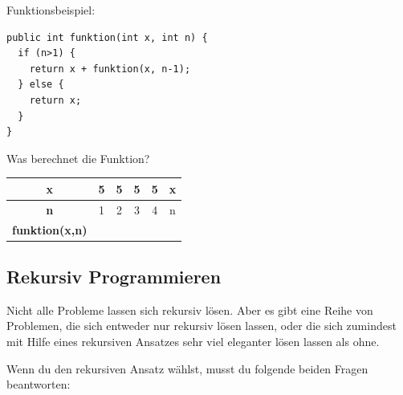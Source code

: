 

Funktionsbeispiel:

\begin{lstlisting}
public int funktion(int x, int n) {
  if (n>1) {
    return x + funktion(x, n-1);
  } else {
    return x;
  }
}
\end{lstlisting}

Was berechnet die Funktion?

\begin{tabular}{|c|c|c|c|c|c|}\hline
\textbf{x}             & 5 & 5 & 5 & 5 & x \\ \hline
\textbf{n}             & 1 & 2 & 3 & 4 & n \\ \hline
\textbf{funktion(x,n)} &  \hspace{1cm} & \hspace{1cm} & \hspace{1cm} &
\hspace{1cm} & \hspace{1cm} \\
\hline
\end{tabular}


\subsection{Rekursiv Programmieren}

Nicht alle Probleme lassen sich rekursiv lösen. Aber es gibt eine Reihe von
Problemen, die sich entweder nur rekursiv lösen lassen, oder die sich zumindest
mit Hilfe eines rekursiven Ansatzes sehr viel eleganter lösen lassen als ohne.

Wenn du den rekursiven Ansatz wählst, musst du folgende beiden Fragen
beantworten:

